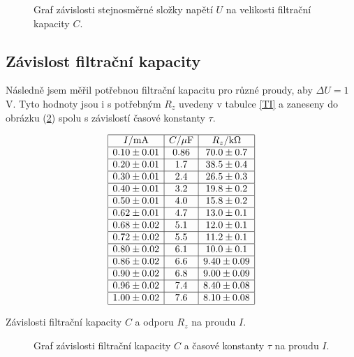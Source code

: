 \documentclass[a4paper,12pt]{article}
\begin{document}
\begin{figure}[htb]
\begin{center}

\end{center}
\caption{Graf závislosti stejnosměrné složky napětí $U$ na velikosti filtrační kapacity $C$.}
\label{g1}
\end{figure}

\subsection{Závislost filtrační kapacity}
Následně jsem měřil potřebnou filtrační kapacitu pro různé proudy, aby $\Delta U=1$V. Tyto 
hodnoty jsou i s potřebným $R_z$ uvedeny v tabulce \ref{TI} a zaneseny do obrázku (\ref{g2}) 
spolu s závislostí časové konstanty $\tau$.

\begin{table}
$$
\begin{array}{|c|c|c|}
\hline
I/\mbox{mA}&    C/\mu\mbox{F}&  R_z/\mbox{k}\Omega \\ \hline
0.10\pm 0.01&    0.86&  70.0\pm0.7 \\ \hline
0.20\pm 0.01&    1.7&   38.5\pm0.4 \\ \hline
0.30\pm 0.01&    2.4&   26.5\pm0.3 \\ \hline
0.40\pm 0.01&    3.2&   19.8\pm0.2 \\ \hline
0.50\pm 0.01&    4.0&   15.8\pm0.2 \\ \hline
0.62\pm 0.01&    4.7&   13.0\pm0.1 \\ \hline
0.68\pm 0.02&    5.1&   12.0\pm0.1 \\ \hline
0.72\pm 0.02&    5.5&   11.2\pm0.1 \\ \hline
0.80\pm 0.02&    6.1&   10.0\pm0.1 \\ \hline
0.86\pm 0.02&    6.6&   9.40\pm0.09 \\ \hline
0.90\pm 0.02&    6.8&   9.00\pm0.09 \\ \hline
0.96\pm 0.02&    7.4&   8.40\pm0.08 \\ \hline
1.00\pm 0.02&    7.6&   8.10\pm0.08 \\ \hline
\end{array}
$$
\caption{Závislosti filtrační kapacity $C$ a odporu $R_z$ na proudu $I$.}
\label{TI}
\end{table}

\begin{figure}
\begin{center}

\end{center}
\caption{Graf závislosti filtrační kapacity $C$ a časové konstanty $\tau$ na proudu $I$.}
\label{g2}
\end{figure}
\end{document}
